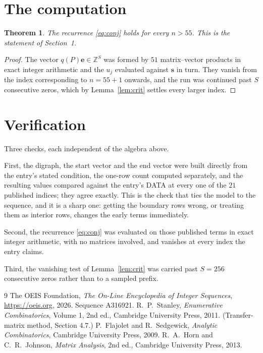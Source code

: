 \documentclass[11pt,a4paper]{article}
\theoremstyle{plain}
\newtheorem{theorem}{Theorem}
\theoremstyle{definition}
\begin{document}
\section{The computation}

\begin{theorem}
The recurrence \eqref{eq:conj} holds for every $n>55$. This is the statement of
Section~1.
\end{theorem}

\begin{proof}
The vector $q(P)\mathbf{e}\in\mathbb{Z}^{S}$ was formed by $51$ matrix--vector
products in exact integer arithmetic and the $u_j$ evaluated against $\mathbf{s}$ in turn.
They vanish from the index corresponding to $n=55+1$ onwards, and the run was continued
past $S$ consecutive zeros, which by Lemma~\ref{lem:crit} settles every larger index.
\end{proof}

\section{Verification}

Three checks, each independent of the algebra above.

First, the digraph, the start vector and the end vector were built directly from the
entry's stated condition, the one-row count computed separately, and the resulting values
compared against the entry's DATA at every one of the $21$ published indices; they
agree exactly. This is the check that ties the model to the sequence, and it is a sharp one:
getting the boundary rows wrong, or treating them as interior rows, changes the early terms
immediately.

Second, the recurrence \eqref{eq:conj} was evaluated on those published terms in exact
integer arithmetic, with no matrices involved, and vanishes at every index the entry claims.

Third, the vanishing test of Lemma~\ref{lem:crit} was carried past $S=256$ consecutive
zeros rather than to a sampled prefix.

\begin{thebibliography}{9}
 The OEIS Foundation, \emph{The On-Line Encyclopedia of Integer
Sequences}, \url{https://oeis.org}, 2026. Sequence A316921.
 R.~P.~Stanley, \emph{Enumerative Combinatorics}, Volume 1, 2nd ed.,
Cambridge University Press, 2011. (Transfer-matrix method, Section 4.7.)
 P.~Flajolet and R.~Sedgewick, \emph{Analytic Combinatorics}, Cambridge
University Press, 2009.
 R.~A.~Horn and C.~R.~Johnson, \emph{Matrix Analysis}, 2nd ed., Cambridge
University Press, 2013.
\end{thebibliography}
\end{document}
